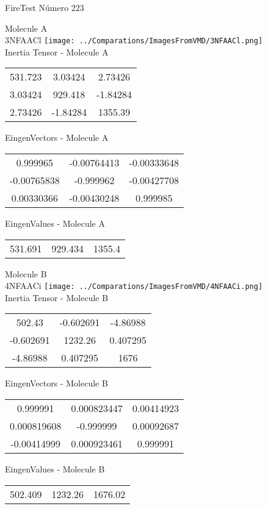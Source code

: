 \vtab[-2cm]
\begin{center}
{\large FireTest \tab Número 223}
\end{center}
\begin{multicols}{2}
\begin{center}

Molecule A \\ 
3NFAACl
\texttt{[image: ../Comparations/ImagesFromVMD/3NFAACl.png]}
\\
Inertia Tensor - Molecule A \\
\vtab

\begin{tabular}{|c c c|}
531.723	 & 	3.03424	 & 	2.73426	 \\
3.03424	 & 	929.418	 & 	-1.84284	 \\
2.73426	 & 	-1.84284	 & 	1355.39
\end{tabular}

\vtab
 EingenVectors - Molecule A     \\
\vtab
\begin{tabular}{|c c c|}
0.999965	 & 	-0.00764413	 & 	-0.00333648	 \\
-0.00765838	 & 	-0.999962	 & 	-0.00427708	 \\
0.00330366	 & 	-0.00430248	 & 	0.999985
\end{tabular}

\vtab
 EingenValues - Molecule A     \\
\vtab
\begin{tabular}{|c c c|}
531.691	 & 	929.434	 & 	1355.4	 \\
\end{tabular}
\columnbreak

Molecule B \\ 
4NFAACi
\texttt{[image: ../Comparations/ImagesFromVMD/4NFAACi.png]}
\\
Inertia Tensor - Molecule B \\
\vtab

\begin{tabular}{|c c c|}
502.43	 & 	-0.602691	 & 	-4.86988	 \\
-0.602691	 & 	1232.26	 & 	0.407295	 \\
-4.86988	 & 	0.407295	 & 	1676
\end{tabular}

\vtab
 EingenVectors - Molecule B     \\
\vtab
\begin{tabular}{|c c c|}
0.999991	 & 	0.000823447	 & 	0.00414923	 \\
0.000819608	 & 	-0.999999	 & 	0.00092687	 \\
-0.00414999	 & 	0.000923461	 & 	0.999991
\end{tabular}

\vtab
 EingenValues - Molecule B     \\
\vtab
\begin{tabular}{|c c c|}
502.409	 & 	1232.26	 & 	1676.02	 \\
\end{tabular}

\end{center}
\end{multicols}
